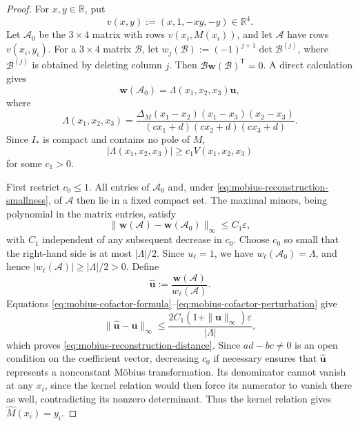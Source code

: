 \documentclass[11pt]{amsart}
\numberwithin{equation}{section}
\theoremstyle{definition}
\theoremstyle{remark}
\newcommand{\R}{\mathbb R}
\begin{document}
\begin{proof}
For \(x,y\in\R\), put
\[
v(x,y):=(x,1,-xy,-y)\in\R^4.
\]
Let \(\mathcal A_0\) be the \(3\times4\) matrix with rows
\(v(x_i,M(x_i))\), and let \(\mathcal A\) have rows \(v(x_i,y_i)\).
For a \(3\times4\) matrix \(\mathcal B\), let
\(w_j(\mathcal B):=(-1)^{j+1}\det\mathcal B^{(j)}\), where
\(\mathcal B^{(j)}\) is obtained by deleting column \(j\). Then
\(\mathcal B\mathbf w(\mathcal B)^{\mathsf T}=0\). A direct
calculation gives
\begin{equation}\label{eq:mobius-cofactor-formula}
\mathbf w(\mathcal A_0)
=\Lambda(x_1,x_2,x_3)\mathbf u,
\end{equation}
where
\[
\Lambda(x_1,x_2,x_3)
=
\frac{\Delta_M
(x_1-x_2)(x_1-x_3)(x_2-x_3)}
{(cx_1+d)(cx_2+d)(cx_3+d)}.
\]
Since \(I_*\) is compact and contains no pole of \(M\),
\begin{equation}\label{eq:mobius-Lambda-lower}
|\Lambda(x_1,x_2,x_3)|
\geq c_1V(x_1,x_2,x_3)
\end{equation}
for some \(c_1>0\).

First restrict \(c_0\leq1\). All entries of \(\mathcal A_0\) and,
under \eqref{eq:mobius-reconstruction-smallness}, of \(\mathcal A\)
then lie in a fixed compact set. The maximal minors, being polynomial
in the matrix entries, satisfy
\begin{equation}\label{eq:mobius-cofactor-perturbation}
\|\mathbf w(\mathcal A)-\mathbf w(\mathcal A_0)\|_\infty
\leq C_1\varepsilon,
\end{equation}
with \(C_1\) independent of any subsequent decrease in \(c_0\).
Choose \(c_0\) so small that the right-hand side is at most
\(|\Lambda|/2\). Since \(u_\ell=1\), we have
\(w_\ell(\mathcal A_0)=\Lambda\), and hence
\(|w_\ell(\mathcal A)|\geq|\Lambda|/2>0\). Define
\[
\widehat{\mathbf u}:=
\frac{\mathbf w(\mathcal A)}{w_\ell(\mathcal A)}.
\]
Equations \eqref{eq:mobius-cofactor-formula}--\eqref{eq:mobius-cofactor-perturbation}
give
\[
\|\widehat{\mathbf u}-\mathbf u\|_\infty
\leq
\frac{2C_1(1+\|\mathbf u\|_\infty)\varepsilon}{|\Lambda|},
\]
which proves \eqref{eq:mobius-reconstruction-distance}.
Since \(ad-bc\neq0\) is an open condition on the coefficient vector,
decreasing \(c_0\) if necessary ensures that \(\widehat{\mathbf u}\)
represents a nonconstant M\"obius transformation.
Its denominator cannot vanish at any \(x_i\), since the kernel
relation would then force its numerator to vanish there as well,
contradicting its nonzero determinant. Thus the kernel relation gives
\(\widehat M(x_i)=y_i\).


\end{proof}
\end{document}
